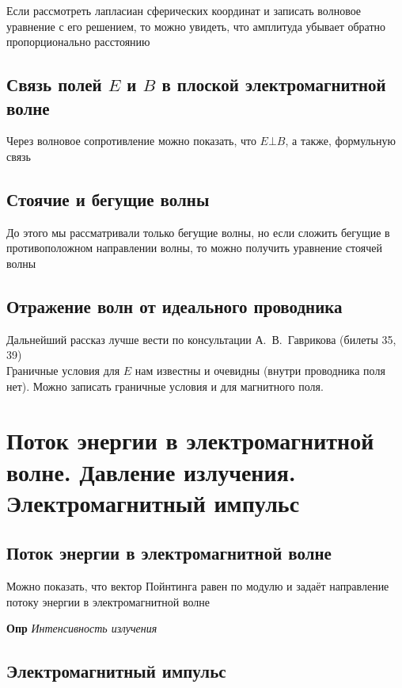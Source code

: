 \documentclass[a4paper, 14pt]{article}
\begin{document}
    Если рассмотреть лапласиан сферических координат и записать волновое уравнение с его решением, то можно увидеть,
    что амплитуда убывает обратно пропорционально расстоянию
    
    \subsection{Связь полей $E$ и $B$ в плоской электромагнитной волне}
    
    Через волновое сопротивление можно показать, что $E \bot B$, а также, формульную связь
    
    \subsection{Стоячие и бегущие волны}
    
    До этого мы рассматривали только бегущие волны, но если сложить бегущие в противоположном направлении волны, то
    можно получить уравнение стоячей волны
    
    \subsection{Отражение волн от идеального проводника}
    
    Дальнейший рассказ лучше вести по консультации А.~В.~Гаврикова (билеты 35, 39) \\
    
    Граничные условия для $E$ нам известны и очевидны (внутри проводника поля нет).
    Можно записать граничные условия и для магнитного поля.
    
    \section{Поток энергии в электромагнитной волне.
    Давление излучения.
    Электромагнитный импульс}
    
    \subsection{Поток энергии в электромагнитной волне}
    
    Можно показать, что вектор Пойнтинга равен по модулю и задаёт направление потоку энергии в электромагнитной волне
    
    \textbf{Опр} \textit{Интенсивность излучения}
    
    \subsection{Электромагнитный импульс}
    
\end{document}
